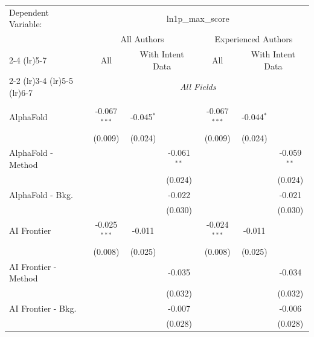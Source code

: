 \begingroup
\centering
\begin{tabular}{lcccccc}
   \tabularnewline \midrule \midrule
   Dependent Variable: & \multicolumn{6}{c}{ln1p\_max\_score}\\
 & \multicolumn{3}{c}{All Authors} & \multicolumn{3}{c}{Experienced Authors} \\
\cmidrule(lr){2-4} \cmidrule(lr){5-7}
 & \multicolumn{1}{c}{All} & \multicolumn{2}{c}{With Intent Data} & \multicolumn{1}{c}{All} & \multicolumn{2}{c}{With Intent Data} \\
\cmidrule(lr){2-2} \cmidrule(lr){3-4} \cmidrule(lr){5-5} \cmidrule(lr){6-7}
 & \multicolumn{6}{c}{\textit{All Fields}} \\ \\
   AlphaFold            & -0.067$^{***}$ & -0.045$^{*}$ &               & -0.067$^{***}$ & -0.044$^{*}$ &   \\   
                        & (0.009)        & (0.024)      &               & (0.009)        & (0.024)      &   \\   
   AlphaFold - Method   &                &              & -0.061$^{**}$ &                &              & -0.059$^{**}$\\   
                        &                &              & (0.024)       &                &              & (0.024)\\   
   AlphaFold - Bkg.     &                &              & -0.022        &                &              & -0.021\\   
                        &                &              & (0.030)       &                &              & (0.030)\\   
   AI Frontier          & -0.025$^{***}$ & -0.011       &               & -0.024$^{***}$ & -0.011       &   \\   
                        & (0.008)        & (0.025)      &               & (0.008)        & (0.025)      &   \\   
   AI Frontier - Method &                &              & -0.035        &                &              & -0.034\\   
                        &                &              & (0.032)       &                &              & (0.032)\\   
   AI Frontier - Bkg.   &                &              & -0.007        &                &              & -0.006\\   
                        &                &              & (0.028)       &                &              & (0.028)\\   

\end{tabular}
